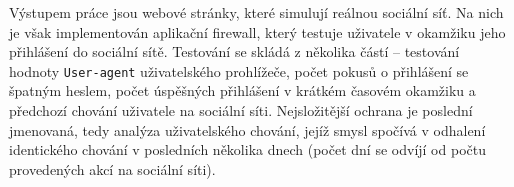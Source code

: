 Výstupem práce jsou webové stránky, které simulují reálnou sociální síť. Na nich je však implementován aplikační firewall, který testuje uživatele v okamžiku jeho přihlášení do sociální sítě. Testování se skládá z několika částí -- testování hodnoty \texttt{User-agent} uživatelského prohlížeče, počet pokusů o přihlášení se špatným heslem, počet úspěšných přihlášení v krátkém časovém okamžiku a předchozí chování uživatele na sociální síti. Nejsložitější ochrana je poslední jmenovaná, tedy analýza uživatelského chování, jejíž smysl spočívá v odhalení identického chování v posledních několika dnech (počet dní se odvíjí od počtu provedených akcí na sociální síti).

